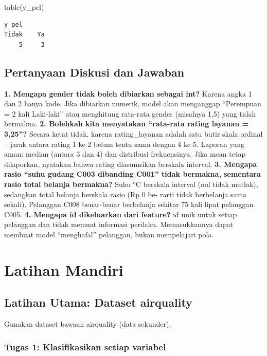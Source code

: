 \documentclass[
  indonesian,
  letterpaper,
]{book}
\newenvironment{Shaded}{\begin{snugshade}}{\end{snugshade}}
\newcommand{\FunctionTok}[1]{\textcolor[rgb]{0.28,0.35,0.67}{#1}}
\newcommand{\NormalTok}[1]{\textcolor[rgb]{0.00,0.23,0.31}{#1}}
\begin{document}
\begin{Shaded}
\begin{Highlighting}[]
\FunctionTok{table}\NormalTok{(y\_pel)}
\end{Highlighting}
\end{Shaded}

\begin{verbatim}
y_pel
Tidak    Ya 
    5     3 
\end{verbatim}

\subsection{Pertanyaan Diskusi dan
Jawaban}\label{pertanyaan-diskusi-dan-jawaban-1}

\textbf{1. Mengapa gender tidak boleh dibiarkan sebagai int?} Karena
angka 1 dan 2 hanya kode. Jika dibiarkan numerik, model akan menganggap
``Perempuan = 2 kali Laki-laki'' atau menghitung rata-rata gender
(misalnya 1,5) yang tidak bermakna. \textbf{2. Bolehkah kita menyatakan
``rata-rata rating layanan = 3,25''?} Secara ketat tidak, karena
rating\_layanan adalah satu butir skala ordinal -- jarak antara rating 1
ke 2 belum tentu sama dengan 4 ke 5. Laporan yang aman: median (antara 3
dan 4) dan distribusi frekuensinya. Jika mean tetap dilaporkan, nyatakan
bahwa rating diasumsikan berskala interval. \textbf{3. Mengapa rasio
``suhu gudang C003 dibanding C001'' tidak bermakna, sementara rasio
total belanja bermakna?} Suhu °C berskala interval (nol tidak mutlak),
sedangkan total belanja berskala rasio (Rp 0 be- rarti tidak berbelanja
sama sekali). Pelanggan C008 benar-benar berbelanja sekitar 75 kali
lipat pelanggan C005. \textbf{4. Mengapa id dikeluarkan dari feature?}
id unik untuk setiap pelanggan dan tidak memuat informasi perilaku.
Memasukkannya dapat membuat model ``menghafal'' pelanggan, bukan
mempelajari pola.

\section{Latihan Mandiri}\label{latihan-mandiri-1}

\subsection{Latihan Utama: Dataset
airquality}\label{latihan-utama-dataset-airquality}

Gunakan dataset bawaan airquality (data sekunder).

\subsubsection{Tugas 1: Klasifikasikan setiap
variabel}\label{tugas-1-klasifikasikan-setiap-variabel}
\end{document}
